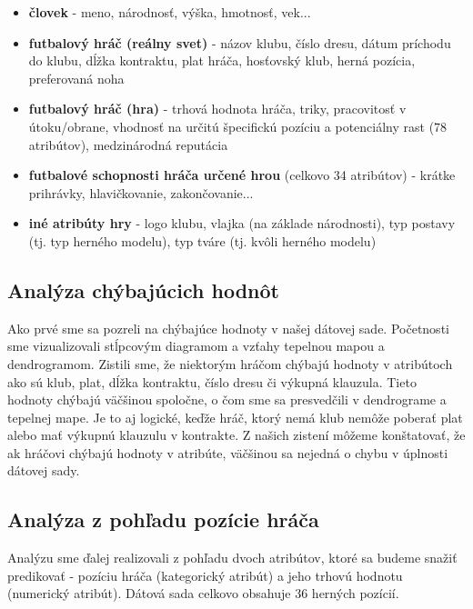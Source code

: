 \documentclass[runningheads]{llncs}
\begin{document}
\begin{itemize}
\item \textbf{človek} - meno, národnosť, výška, hmotnosť, vek...
\item \textbf{futbalový hráč (reálny svet)} - názov klubu, číslo dresu, dátum príchodu do klubu, dĺžka kontraktu, plat hráča, hosťovský klub, herná pozícia, preferovaná noha
\item \textbf{futbalový hráč (hra)} - trhová hodnota hráča, triky, pracovitosť v útoku/obrane, vhodnosť na určitú špecifickú pozíciu a potenciálny rast (78 atribútov), medzinárodná reputácia
\item \textbf{futbalové schopnosti hráča určené hrou} (celkovo 34 atribútov) - krátke prihrávky, hlavičkovanie, zakončovanie...
\item \textbf{iné atribúty hry} - logo klubu, vlajka (na základe národnosti), typ postavy (tj. typ herného modelu), typ tváre (tj. kvôli herného modelu)
\end{itemize}

\subsection{Analýza chýbajúcich hodnôt} \label{analyza_chybajucich_hodnot}


Ako prvé sme sa pozreli na chýbajúce hodnoty v našej dátovej sade. Početnosti sme vizualizovali stĺpcovým diagramom a vzťahy tepelnou mapou a dendrogramom. Zistili sme, že niektorým hráčom chýbajú hodnoty v atribútoch ako sú klub, plat, dĺžka kontraktu, číslo dresu či výkupná klauzula. Tieto hodnoty chýbajú väčšinou spoločne, o čom sme sa presvedčili v dendrograme a tepelnej mape. Je to aj logické, keďže hráč, ktorý nemá klub nemôže poberať plat alebo mať výkupnú klauzulu v kontrakte. Z našich zistení môžeme konštatovať, že ak hráčovi chýbajú hodnoty v atribúte, väčšinou sa nejedná o chybu v úplnosti dátovej sady.

\subsection{Analýza z pohľadu pozície hráča} \label{analyza_z_pohladu_pozicie}

Analýzu sme ďalej realizovali z pohľadu dvoch atribútov, ktoré sa budeme snažiť predikovať - pozíciu hráča (kategorický atribút) a jeho trhovú hodnotu (numerický atribút). Dátová sada celkovo obsahuje 36 herných pozícií. 
\end{document}
